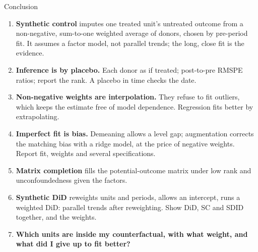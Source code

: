 \documentclass[
  11pt,
  ignorenonframetext,
  aspectratio=169,
]{beamer}
\providecommand{\tightlist}{%
  \setlength{\itemsep}{0pt}\setlength{\parskip}{0pt}}
\begin{document}
\begin{frame}{Conclusion}
\protect{}\label{conclusion}
\begin{enumerate}
\tightlist
\item
  \textbf{Synthetic control} imputes one treated unit's untreated
  outcome from a non-negative, sum-to-one weighted average of donors,
  chosen by pre-period fit. It assumes a factor model, not parallel
  trends; the long, close fit is the evidence.
\item
  \textbf{Inference is by placebo.} Each donor as if treated;
  post-to-pre RMSPE ratios; report the rank. A placebo in time checks
  the date.
\item
  \textbf{Non-negative weights are interpolation.} They refuse to fit
  outliers, which keeps the estimate free of model dependence.
  Regression fits better by extrapolating.
\item
  \textbf{Imperfect fit is bias.} Demeaning allows a level gap;
  augmentation corrects the matching bias with a ridge model, at the
  price of negative weights. Report fit, weights and several
  specifications.
\item
  \textbf{Matrix completion} fills the potential-outcome matrix under
  low rank and unconfoundedness given the factors.
\item
  \textbf{Synthetic DiD} reweights units and periods, allows an
  intercept, runs a weighted DiD: parallel trends after reweighting.
  Show DiD, SC and SDID together, and the weights.
\item
  \textbf{Which units are inside my counterfactual, with what weight,
  and what did I give up to fit better?}
\end{enumerate}
\end{frame}
\end{document}
